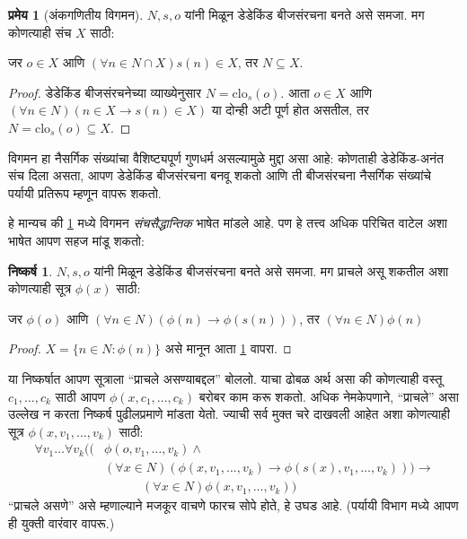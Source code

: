 \documentclass[11pt,a4paper,openany]{book}
\theoremstyle{definition}
\newtheorem{thm}[defn]{प्रमेय}
\newcommand{\Setabs}[2]{\{#1:#2\}}
\newcommand{\lif}{\mathbin{\to}}
\newtheorem{cor}[defn]{निष्कर्ष}
\newcommand{\closureofunder}[2]{\mathrm{clo}_{#1}(#2)}
\begin{document}
\begin{thm}[अंकगणितीय विगमन]\label{sfr:infinite:induction:thm:dedinfiniteinduction}
$N, s, o$ यांनी मिळून डेडेकिंड बीजसंरचना बनते असे समजा. मग कोणत्याही
संच $X$ साठी:
	\begin{center}
		जर $o \in X$ आणि $(\forall {n} \in N \cap X){s}({n}) \in X$, {तर} $N \subseteq X$.
	\end{center}
\end{thm}

\begin{proof}
डेडेकिंड बीजसंरचनेच्या व्याख्येनुसार $N = \closureofunder{s}{o}$.
आता ${o} \in X$ आणि $(\forall {n} \in N)(n \in X \lif
{s}({n}) \in X)$ या दोन्ही अटी पूर्ण होत असतील, तर
$N = \closureofunder{s}{o} \subseteq X$.
\end{proof}

विगमन हा नैसर्गिक संख्यांचा वैशिष्ट्यपूर्ण गुणधर्म असल्यामुळे मुद्दा असा
आहे: कोणताही डेडेकिंड-अनंत संच दिला असता, आपण डेडेकिंड बीजसंरचना बनवू
शकतो आणि ती बीजसंरचना नैसर्गिक संख्यांचे पर्यायी प्रतिरूप म्हणून वापरू
शकतो.

हे मान्यच की \ref{sfr:infinite:induction:thm:dedinfiniteinduction} मध्ये विगमन
\emph{संचसैद्धान्तिक} भाषेत मांडले आहे. पण हे तत्त्व अधिक परिचित वाटेल
अशा भाषेत आपण सहज मांडू शकतो:

\begin{cor}\label{sfr:infinite:induction:natinductionschema}
$N, s, o$ यांनी मिळून डेडेकिंड बीजसंरचना बनते असे समजा. मग प्राचले असू
शकतील अशा कोणत्याही सूत्र $\phi(x)$ साठी:
\begin{center}
	जर $\phi(o)$ आणि $(\forall {n} \in N)(\phi(n)\lif
	\phi({s}({n})))$, {तर} $(\forall n \in N)\phi(n)$
\end{center}
\end{cor}

\begin{proof}
$X = \Setabs{n \in N}{\phi(n)}$ असे मानून आता
\ref{sfr:infinite:induction:thm:dedinfiniteinduction} वापरा.
\end{proof}

या निष्कर्षात आपण सूत्राला ``प्राचले असण्याबद्दल'' बोललो. याचा ढोबळ
अर्थ असा की कोणत्याही वस्तू $c_1, \ldots, c_k$ साठी आपण
$\phi(x, c_1, \ldots, c_k)$ बरोबर काम करू शकतो. अधिक नेमकेपणाने,
``प्राचले'' असा उल्लेख न करता निष्कर्ष पुढीलप्रमाणे मांडता येतो.
ज्याची सर्व मुक्त चरे दाखवली आहेत अशा कोणत्याही सूत्र
$\phi(x, v_1, \ldots, v_k)$ साठी:
	\begin{align*}
			\forall v_1 \ldots \forall v_k((&\phi(o, v_1,\ldots, v_k) \land {}\\
			&	(\forall x \in N)(\phi(x,v_1, \ldots, v_k) \lif \phi(s(x), v_1,\ldots, v_k))) \lif {}\\
			&\hspace{3em} (\forall x \in N)\phi(x, v_1,\ldots, v_k))
	\end{align*}
``प्राचले असणे'' असे म्हणाल्याने मजकूर वाचणे फारच सोपे होते, हे उघड आहे.
(पर्यायी विभाग मध्ये आपण ही युक्ती वारंवार वापरू.)
\end{document}
